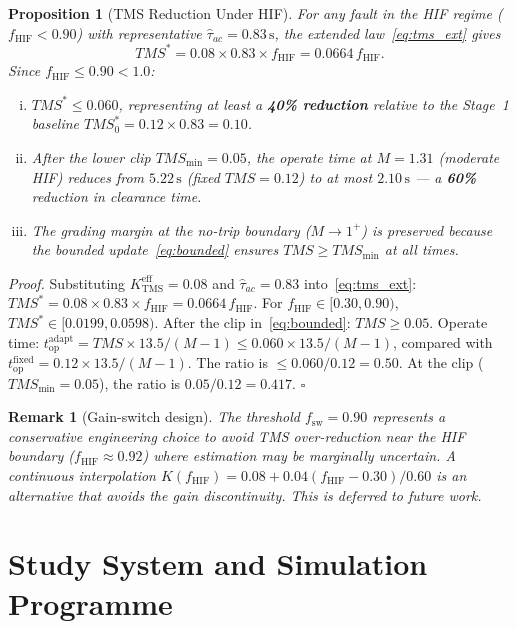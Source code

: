 \documentclass[10pt,journal,twoside]{IEEEtran}
\newtheorem{proposition}{Proposition}
\newtheorem{remark}{Remark}
\newcommand{\sss}{\,\text{s}}
\newcommand{\tms}{TMS}
\newcommand{\tmss}{TMS^*}
\newcommand{\tauac}{\hat{\tau}_{ac}}
\newcommand{\fhif}{f_{\mathrm{HIF}}}
\newcommand{\Keff}{K_{\mathrm{TMS}}^{\mathrm{eff}}}
\begin{document}
\begin{proposition}[TMS Reduction Under HIF]
\label{prop:tmsreduce}
For any fault in the HIF regime ($\fhif < 0.90$) with representative
$\tauac = 0.83\sss$, the extended law~\eqref{eq:tms_ext} gives
\begin{equation}
\tmss = 0.08 \times 0.83 \times \fhif = 0.0664\,\fhif.
\label{eq:prop_tms}
\end{equation}
Since $\fhif \leq 0.90 < 1.0$:
\begin{enumerate}[(i)]
  \item $\tmss \leq 0.060$, representing at least a \textbf{40\% reduction}
        relative to the Stage~1 baseline $\tmss_0 = 0.12 \times 0.83 = 0.10$.
  \item After the lower clip $\tms_{\min} = 0.05$, the operate time at
        $M = 1.31$ (moderate HIF) reduces from $5.22\sss$
        (fixed $\tms = 0.12$) to at most $2.10\sss$ --- a \textbf{60\%}
        reduction in clearance time.
  \item The grading margin at the no-trip boundary ($M \to 1^+$) is
        preserved because the bounded update~\eqref{eq:bounded} ensures
        $\tms \geq \tms_{\min}$ at all times.
\end{enumerate}
\end{proposition}

\textit{Proof.}
Substituting $\Keff = 0.08$ and $\tauac = 0.83$ into~\eqref{eq:tms_ext}:
$\tmss = 0.08 \times 0.83 \times \fhif = 0.0664\,\fhif$.
For $\fhif \in [0.30, 0.90)$, $\tmss \in [0.0199, 0.0598)$.
After the clip in~\eqref{eq:bounded}: $\tms \geq 0.05$.
Operate time: $t_{\mathrm{op}}^{\mathrm{adapt}} = \tms \times 13.5/(M-1)
\leq 0.060 \times 13.5/(M-1)$, compared with
$t_{\mathrm{op}}^{\mathrm{fixed}} = 0.12 \times 13.5/(M-1)$.
The ratio is $\leq 0.060/0.12 = 0.50$.  At the clip ($\tms_{\min} = 0.05$),
the ratio is $0.05/0.12 = 0.417$. $\square$

\begin{remark}[Gain-switch design]
The threshold $f_{\mathrm{sw}} = 0.90$ represents a conservative engineering
choice to avoid TMS over-reduction near the HIF boundary ($\fhif \approx 0.92$)
where estimation may be marginally uncertain.  A continuous interpolation
$K(\fhif) = 0.08 + 0.04(\fhif - 0.30)/0.60$ is an alternative that avoids
the gain discontinuity.  This is deferred to future work.
\end{remark}

\section{Study System and Simulation Programme}
\label{sec:system}
\end{document}
